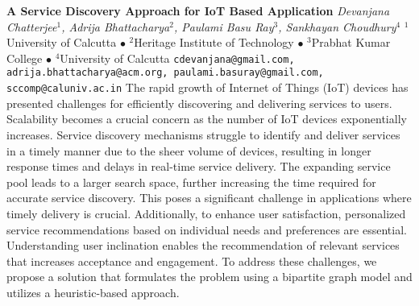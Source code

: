 
    \begin{conf-abstract}[]
        {\textbf{A Service Discovery Approach for IoT Based Application}}
        {\textit{Devanjana Chatterjee$^{1}$, Adrija Bhattacharya$^{2}$, Paulami Basu  Ray$^{3}$, Sankhayan  Choudhury$^{4}$}}
        {$^{1}$University of Calcutta $\bullet$ $^{2}$Heritage Institute of Technology $\bullet$ $^{3}$Prabhat Kumar College $\bullet$ $^{4}$University of Calcutta}
        {\texttt{cdevanjana@gmail.com, adrija.bhattacharya@acm.org, paulami.basuray@gmail.com, sccomp@caluniv.ac.in}}
        {The rapid growth of Internet of Things (IoT) devices has presented challenges for efficiently discovering and delivering services to users. Scalability becomes a crucial concern as the number of IoT devices exponentially increases. Service discovery mechanisms struggle to identify and deliver services in a timely manner due to the sheer volume of devices, resulting in longer response times and delays in real-time service delivery. The expanding service pool leads to a larger search space, further increasing the time required for accurate service discovery. This poses a significant challenge in applications where timely delivery is crucial. Additionally, to enhance user satisfaction, personalized service recommendations based on individual needs and preferences are essential. Understanding user inclination enables the recommendation of relevant services that increases acceptance and engagement. To address these challenges, we propose a solution that formulates the problem using a bipartite graph model and utilizes a heuristic-based approach.}
    \end{conf-abstract}
        